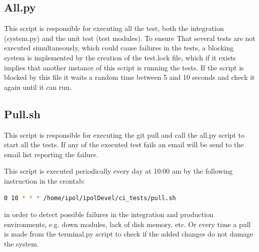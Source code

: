 \subsection{All.py}

This script is responsible for executing all the test, both the integration (system.py) and the unit test (test modules). To ensure
That several tests are not executed simultaneously, which could cause failures in the tests, a blocking system is implemented by the creation 
of the test.lock file, which if it exists implies that another instance of this script is running the tests.
If the script is blocked by this file it waits a random time between 5 and 10 seconds and check it again until it can run.


\subsection{Pull.sh}

This script is responsible for executing the git pull and call the all.py script to start all the tests. If any of the executed test fails an email
will be send to the email list reporting the failure.

This script is executed periodically every day at 10:00 am by the following instruction in the crontab: \begin{lstlisting}[language=Bash]
 0 10 * * * /home/ipol/ipolDevel/ci_tests/pull.sh
\end{lstlisting} in order to detect possible failures in the integration and production
environments, e.g. down modules, lack of disk memory, etc. Or every time a pull is made from the terminal.py script to check if the added changes do not
damage the system.
